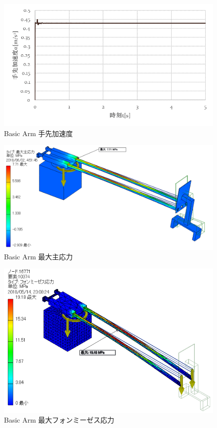 \documentclass[10pt,b5paper,papersize,dvipdfmx]{jsbook}
\begin{document}
\begin{figure}[htbp]
  \centering
  \includegraphics[width=12cm]{img/robot09.png}
  \caption{Basic Arm 手先加速度}
  \label{fig:Basic Arm 手先加速度}
\end{figure}
\begin{figure}[htbp]
  \centering
  \includegraphics[width=12cm]{img/robot10.png}
  \caption{Basic Arm 最大主応力}
  \label{fig:Basic Arm 最大主応力}
\end{figure}
\begin{figure}[htbp]
  \centering
  \includegraphics[width=12cm]{img/robot11.png}
  \caption{Basic Arm 最大フォンミーゼス応力}
  \label{fig:Basic Arm 最大フォンミーゼス応力}
\end{figure}
\end{document}

